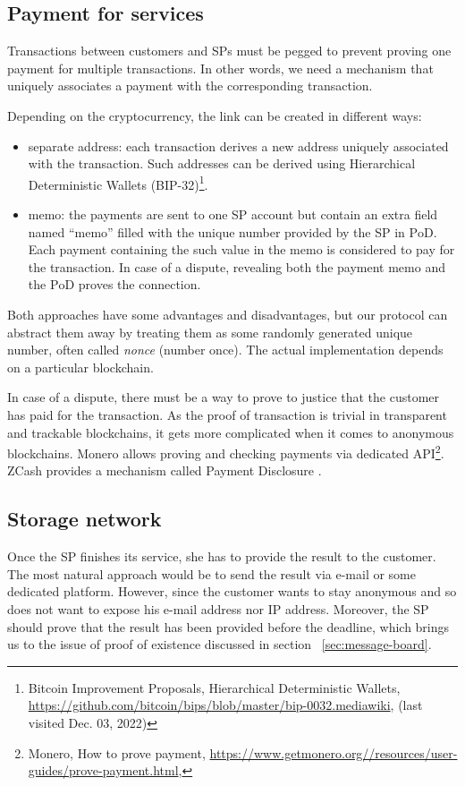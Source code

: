 \subsection{Payment for services}\label{payment-for-services}
Transactions between customers and SPs must be pegged to prevent proving one payment for multiple transactions. In other
words, we need a mechanism that uniquely associates a payment with the corresponding transaction.

Depending on the cryptocurrency, the link can be created in different
ways:
\begin{itemize}

\item separate address: each transaction derives a new address uniquely associated with the transaction. Such addresses can be derived using Hierarchical Deterministic Wallets (BIP-32)\footnote{Bitcoin Improvement Proposals, Hierarchical Deterministic Wallets, \url{https://github.com/bitcoin/bips/blob/master/bip-0032.mediawiki}, (last visited Dec. 03, 2022)}.
\item memo: the payments are sent to one SP account but contain an extra field named ``memo'' filled with the unique number provided by the SP in $\mathrm{PoD}$. Each payment containing the such value in the memo is considered to pay for the transaction. In case of a dispute, revealing both the payment memo and the $\mathrm{PoD}$ proves the connection.
\end{itemize}

Both approaches have some advantages and disadvantages, but our protocol can abstract them away by treating them as some randomly generated unique number, often called \textit{nonce} (number once). The actual implementation depends on a particular blockchain.

In case of a dispute, there must be a way to prove to justice that the customer has paid for the transaction. As the proof of transaction is trivial in transparent and trackable blockchains, it gets more complicated when it comes to anonymous blockchains. Monero allows proving and checking payments via dedicated API\footnote{Monero, How to prove payment, \url{https://www.getmonero.org//resources/user-guides/prove-payment.html}, \LASTVISITED}. ZCash provides a mechanism called Payment Disclosure \cite{daviesIntroductionPaymentDisclosure2017}.

\subsection{Storage network}\label{storage-network}
Once the SP finishes its service, she has to provide the result to the customer. The most natural approach would be to send the result via e-mail or some dedicated platform. However, since the customer wants to stay anonymous and so does not want to expose his e-mail address nor IP address. Moreover, the SP should prove that the result has been provided before the deadline, which brings us to the issue of proof of existence discussed in section ~\ref{sec:message-board}.

